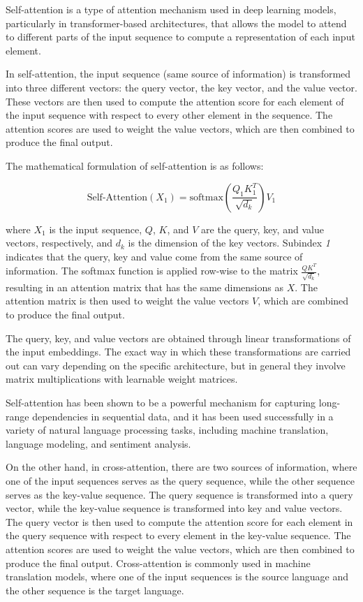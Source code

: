 Self-attention is a type of attention mechanism used in deep learning models, particularly in transformer-based architectures, that allows the model to attend to different parts of the input sequence to compute a representation of each input element.

In self-attention, the input sequence (same source of information) is transformed into three different vectors: the query vector, the key vector, and the value vector. These vectors are then used to compute the attention score for each element of the input sequence with respect to every other element in the sequence. The attention scores are used to weight the value vectors, which are then combined to produce the final output.

The mathematical formulation of self-attention is as follows:

\begin{equation}
	\text{Self-Attention}(X_{1}) = \text{softmax}\left(\frac{Q_{1}K_{1}^T}{\sqrt{d_k}}\right)V_{1}
\end{equation}

where $X_{1}$ is the input sequence, $Q$, $K$, and $V$ are the query, key, and value vectors, respectively, and $d_k$ is the dimension of the key vectors. Subindex \textit{1} indicates that the query, key and value come from the same source of information. The softmax function is applied row-wise to the matrix $\frac{QK^T}{\sqrt{d_k}}$, resulting in an attention matrix that has the same dimensions as $X$. The attention matrix is then used to weight the value vectors $V$, which are combined to produce the final output.

The query, key, and value vectors are obtained through linear transformations of the input embeddings. The exact way in which these transformations are carried out can vary depending on the specific architecture, but in general they involve matrix multiplications with learnable weight matrices.

Self-attention has been shown to be a powerful mechanism for capturing long-range dependencies in sequential data, and it has been used successfully in a variety of natural language processing tasks, including machine translation, language modeling, and sentiment analysis.

On the other hand, in cross-attention, there are two sources of information, where one of the input sequences serves as the query sequence, while the other sequence serves as the key-value sequence. The query sequence is transformed into a query vector, while the key-value sequence is transformed into key and value vectors. The query vector is then used to compute the attention score for each element in the query sequence with respect to every element in the key-value sequence. The attention scores are used to weight the value vectors, which are then combined to produce the final output. Cross-attention is commonly used in machine translation models, where one of the input sequences is the source language and the other sequence is the target language.

